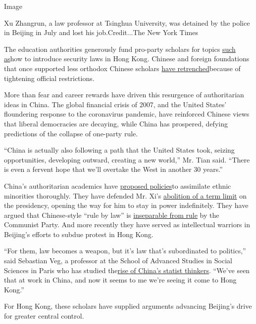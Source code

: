 Image

Xu Zhangrun, a law professor at Tsinghua University, was detained by the
police in Beijing in July and lost his job.Credit...The New York Times

The education authorities generously fund pro-party scholars for topics
\href{http://news.sohu.com/20150720/n417161554.shtml}{such as}how to
introduce security laws in Hong Kong. Chinese and foreign foundations
that once supported less orthodox Chinese scholars
\href{https://www.nytimes3xbfgragh.onion/2016/12/29/world/asia/china-foreign-ngo.html}{have
retrenched}because of tightening official restrictions.

More than fear and career rewards have driven this resurgence of
authoritarian ideas in China. The global financial crisis of 2007, and
the United States' floundering response to the coronavirus pandemic,
have reinforced Chinese views that liberal democracies are decaying,
while China has prospered, defying predictions of the collapse of
one-party rule.

``China is actually also following a path that the United States took,
seizing opportunities, developing outward, creating a new world,'' Mr.
Tian said. ``There is even a fervent hope that we'll overtake the West
in another 30 years.''

China's authoritarian academics have
\href{https://jamestown.org/program/toward-a-second-generation-of-ethnic-policies/}{proposed
policies}to assimilate ethnic minorities thoroughly. They have defended
Mr. Xi's
\href{https://www.nytimes3xbfgragh.onion/2018/03/11/world/asia/china-xi-constitution-term-limits.html}{abolition
of a term limit} on the presidency, opening the way for him to stay in
power indefinitely. They have argued that Chinese-style ``rule by law''
is \href{http://www.aisixiang.com/data/77230.html}{inseparable from
rule} by the Communist Party. And more recently they have served as
intellectual warriors in Beijing's efforts to subdue protest in Hong
Kong.

``For them, law becomes a weapon, but it's law that's subordinated to
politics,'' said Sebastian Veg, a professor at the School of Advanced
Studies in Social Sciences in Paris who has studied
the\href{https://www.journals.uchicago.edu/doi/abs/10.1086/702687}{rise
of China's statist thinkers}. ``We've seen that at work in China, and
now it seems to me we're seeing it come to Hong Kong.''

For Hong Kong, these scholars have supplied arguments advancing
Beijing's drive for greater central control.


